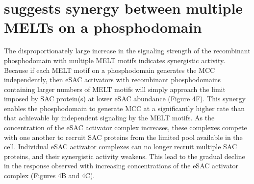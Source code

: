 \section{suggests synergy between multiple MELTs on a  phosphodomain}

The disproportionately large increase in the signaling strength of the recombinant  phosphodomain with multiple MELT motifs indicates synergistic activity. Because if each MELT motif on a  phosphodomain generates the MCC independently, then eSAC activators with recombinant phosphodomains containing larger numbers of MELT motifs will simply approach the limit imposed by SAC protein(s) at lower eSAC abundance (Figure 4F). This synergy enables the phosphodomain to generate MCC at a significantly higher rate than that achievable by independent signaling by the MELT motifs. As the concentration of the eSAC activator complex increases, these complexes compete with one another to recruit SAC proteins from the limited pool available in the cell. Individual eSAC activator complexes can no longer recruit multiple SAC proteins, and their synergistic activity weakens. This lead to the gradual decline in the response observed with increasing concentrations of the eSAC activator complex (Figures 4B and 4C).